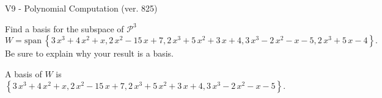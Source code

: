 \begin{exercise}
  \begin{exerciseTitle}V9 - Polynomial Computation (ver. 825)\end{exerciseTitle}
  \begin{exerciseStatement}
    Find a basis for the subspace of \(\mathcal{P}^3\) 
\[W=\mathrm{span}\ \left\{3 \, x^{3} + 4 \, x^{2} + x , 2 \, x^{2} - 15 \, x + 7 , 2 \, x^{3} + 5 \, x^{2} + 3 \, x + 4 , 3 \, x^{3} - 2 \, x^{2} - x - 5 , 2 \, x^{3} + 5 \, x - 4\right\}.\]
 Be sure to explain why your result is a basis.


  \end{exerciseStatement}
  \begin{exerciseAnswer}
   A basis of \(W\) is  \(\left\{3 \, x^{3} + 4 \, x^{2} + x , 2 \, x^{2} - 15 \, x + 7 , 2 \, x^{3} + 5 \, x^{2} + 3 \, x + 4 , 3 \, x^{3} - 2 \, x^{2} - x - 5\right\}\).
  


  \end{exerciseAnswer}
\end{exercise}